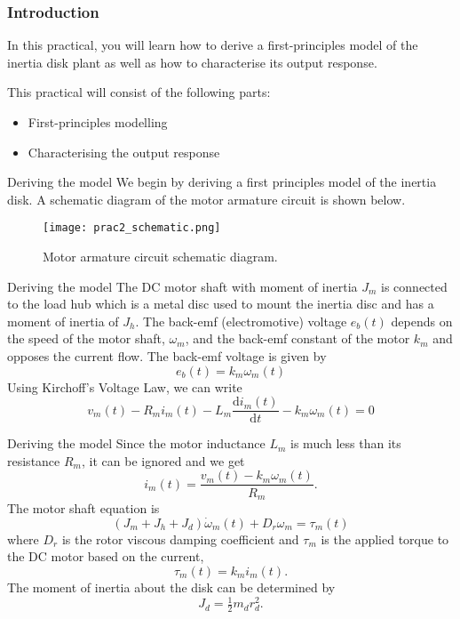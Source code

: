 \documentclass[9pt]{beamer-control}
\begin{document}
	

\begin{frame}
\frametitle{Introduction}
In this practical, you will learn how to derive a first-principles model of the inertia disk plant as well as how to characterise its output response.

\vfill

This practical will consist of the following parts:
\begin{itemize}
\item First-principles modelling
\item Characterising the output response
\end{itemize}
\end{frame}



\begin{frame}{Deriving the model}
We begin by deriving a first principles model of the inertia disk. A schematic diagram of the motor armature circuit is shown below.

\begin{figure}
	\centering
	\texttt{[image: prac2\_schematic.png]}
	\caption{Motor armature circuit schematic diagram.}
\end{figure}
\end{frame}

\begin{frame}{Deriving the model}
The DC motor shaft with moment of inertia $J_m$ is connected to the load hub which is a metal disc used to mount the inertia disc and has a moment of inertia of $J_h$. The back-emf (electromotive) voltage $e_b(t)$ depends on the speed of the motor shaft, $\omega_m$, and the back-emf constant of the motor $k_m$ and opposes the current flow. The back-emf voltage is given by 
\[e_b(t) = k_m \omega _m (t) \]
Using Kirchoff's Voltage Law, we can write
\[v_m(t) - R_m i_m(t)-L_m \frac{\mathrm{d} i_m(t)}{\mathrm{d} t} - k_m \omega_m (t) = 0\]

\end{frame}

\begin{frame}{Deriving the model}
Since the motor inductance $L_m$ is much less than its resistance $R_m$, it can be ignored and we get
\[i_m(t) = \frac{v_m(t) - k_m \omega_m (t)}{R_m} .\]
The motor shaft equation is
\[(J_m+J_h+J_d)\dot{\omega}_m (t) + D_r \omega _m = \tau_m(t)\]
where $D_r$ is the rotor viscous damping coefficient and $\tau_m$ is the applied torque to the DC motor based on the current,
\[ \tau_m(t) = k_m i_m (t).\]
The moment of inertia about the disk can be determined by
\[J_d = \tfrac{1}{2} m_d r_d^2.\]
\end{frame}
\end{document}
